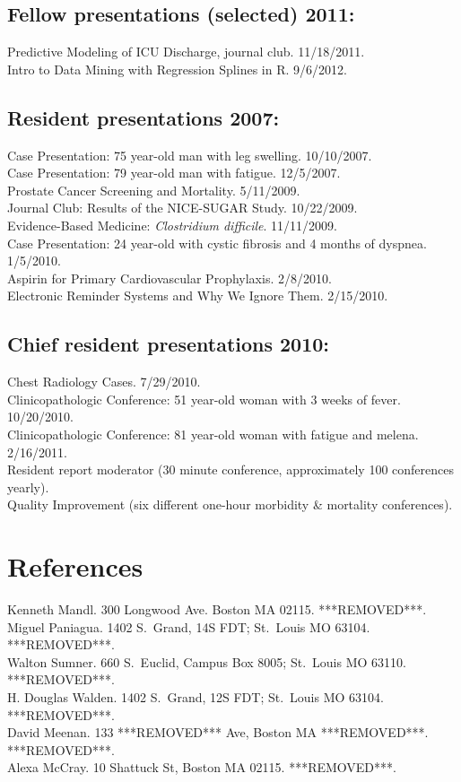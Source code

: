 \documentclass[12pt]{article}
\begin{document}
\subsection{Fellow presentations (selected) 2011:}
Predictive Modeling of ICU Discharge, journal club. 11/18/2011.\\
Intro to Data Mining with Regression Splines in R. 9/6/2012.

\subsection{Resident presentations 2007:}
Case Presentation: 75 year-old man with leg swelling. 10/10/2007.\\
Case Presentation: 79 year-old man with fatigue. 12/5/2007.\\
Prostate Cancer Screening and Mortality. 5/11/2009.\\
Journal Club: Results of the NICE-SUGAR Study. 10/22/2009.\\
Evidence-Based Medicine: \emph{Clostridium difficile}. 11/11/2009.\\
Case Presentation: 24 year-old with cystic fibrosis and 4 months of
dyspnea. 1/5/2010.\\
Aspirin for Primary Cardiovascular Prophylaxis. 2/8/2010.\\
Electronic Reminder Systems and Why We Ignore Them. 2/15/2010.

\subsection{Chief resident presentations 2010:}
Chest Radiology Cases. 7/29/2010.\\
Clinicopathologic Conference: 51 year-old woman with 3 weeks of fever.
10/20/2010.\\
Clinicopathologic Conference: 81 year-old woman with fatigue and
melena. 2/16/2011.\\
Resident report moderator (30 minute conference, approximately 100
conferences yearly).\\
Quality Improvement (six different one-hour morbidity \& mortality
conferences).\\

\section{References}
Kenneth Mandl. 300 Longwood Ave. Boston MA 02115. ***REMOVED***.\\
Miguel Paniagua. 1402 S.\ Grand, 14S FDT; St.\ Louis MO 63104.
***REMOVED***.\\
Walton Sumner. 660 S.\ Euclid, Campus Box 8005; St.\ Louis MO 63110.
***REMOVED***.\\
H. Douglas Walden. 1402 S.\ Grand, 12S FDT; St.\ Louis MO 63104.
***REMOVED***.\\
David Meenan. 133 ***REMOVED*** Ave, Boston MA ***REMOVED***. ***REMOVED***.\\
Alexa McCray. 10 Shattuck St, Boston MA 02115. ***REMOVED***.\\
\end{document}
